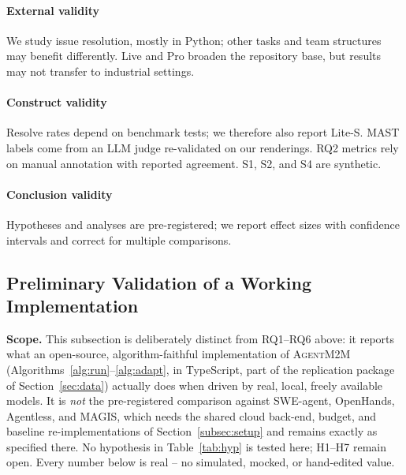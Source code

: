 \documentclass[10pt, anonymous, conference]{IEEEtran}
\theoremstyle{definition}
\theoremstyle{plain}
\theoremstyle{remark}
\newcommand{\tool}{\textsc{AgentM2M}}
\begin{document}
\paragraph{External validity}
We study issue resolution, mostly in Python; other tasks and team structures
may benefit differently. Live and Pro broaden the repository base, but results
may not transfer to industrial settings.

\paragraph{Construct validity}
Resolve rates depend on benchmark tests; we therefore also report Lite-S.
MAST labels come from an LLM judge re-validated on our renderings. RQ2 metrics
rely on manual annotation with reported agreement. S1, S2, and S4 are
synthetic.

\paragraph{Conclusion validity}
Hypotheses and analyses are pre-registered; we report effect sizes with
confidence intervals and correct for multiple comparisons.

\subsection{Preliminary Validation of a Working Implementation}\label{subsec:protovalidation}
\noindent\textbf{Scope.} This subsection is deliberately distinct from RQ1--RQ6 above: it reports what an
open-source, algorithm-faithful implementation of \tool{} (Algorithms~\ref{alg:run}--\ref{alg:adapt}, in
TypeScript, part of the replication package of Section~\ref{sec:data}) actually does when driven by real,
local, freely available models. It is \emph{not} the pre-registered comparison against SWE-agent, OpenHands, Agentless, and MAGIS,
which needs the shared cloud back-end, budget, and baseline re-implementations of
Section~\ref{subsec:setup} and remains exactly as specified there. No hypothesis in Table~\ref{tab:hyp} is
tested here; H1--H7 remain open. Every number below is real -- no simulated, mocked, or hand-edited value.
\end{document}
